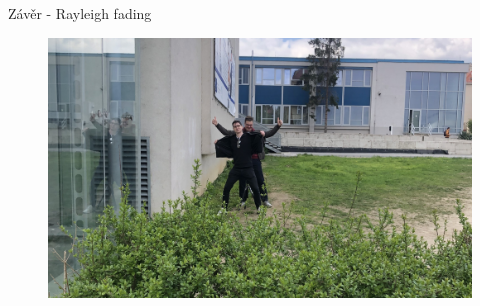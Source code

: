 \documentclass[aspectratio=169, 12pt, hyperref={unicode}]{beamer}
\begin{document}
\begin{frame}{Závěr - Rayleigh fading}
	\begin{figure}[!ht]
		\centering
		\includegraphics[width=.7\textwidth]{src/fotka-rayleigh.jpg}
	\end{figure}
\end{frame}

\end{document}
